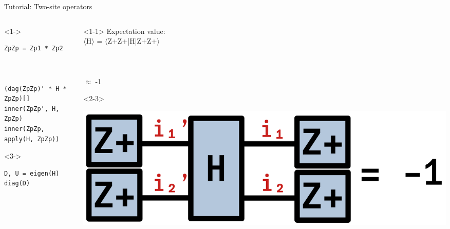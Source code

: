 \begin{frame}[fragile]{Tutorial: Two-site operators}

\begin{columns}

\begin{column}{5cm}

\begin{onlyenv}<1->
\begin{lstlisting}[language=JuliaLocal, style=julia, basicstyle=\small]
ZpZp = Zp1 * Zp2



(dag(ZpZp)' * H * ZpZp)[]
inner(ZpZp', H, ZpZp)
inner(ZpZp, apply(H, ZpZp))
\end{lstlisting}
\end{onlyenv}

\begin{onlyenv}<3->
\begin{lstlisting}[language=JuliaLocal, style=julia, basicstyle=\small]
D, U = eigen(H)
diag(D)
\end{lstlisting}
\end{onlyenv}

\end{column}

\begin{column}{5cm}

\begin{onlyenv}<1-1>
Expectation value: \\
$\langle$H$\rangle$ = $\langle$Z+Z+|H|Z+Z+$\rangle$ \\
~\\
~\\
~\\
$\approx$ -1 \\
\end{onlyenv}

\begin{onlyenv}<2-3>
\vspace*{0.0cm}
\begin{center}
\includegraphics[width=1.0\textwidth]{
  slides/assets/Zp1Zp2HZp1Zp2.png
}
\end{center}
\vspace*{0.0cm}
\end{onlyenv}


\end{column}
\end{columns}
\end{frame}
